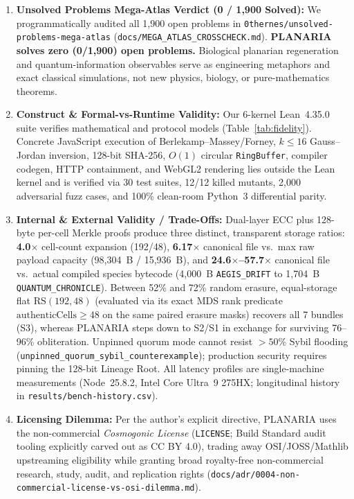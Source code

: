 \documentclass[11pt,letterpaper]{article}
\theoremstyle{remark}
\begin{document}
\begin{enumerate}[leftmargin=1.6em, itemsep=1.5pt]
  \item \textbf{Unsolved Problems Mega-Atlas Verdict (0 / 1,900 Solved):} We programmatically audited all 1,900 open problems in \texttt{0thernes/\allowbreak unsolved-\allowbreak problems-\allowbreak mega-\allowbreak atlas} (\texttt{docs/\allowbreak MEGA\_\allowbreak ATLAS\_\allowbreak CROSSCHECK.md}). \textbf{PLANARIA solves zero (0/1,900) open problems.} Biological planarian regeneration and quantum-information observables serve as engineering metaphors and exact classical simulations, not new physics, biology, or pure-mathematics theorems.
  \item \textbf{Construct \& Formal-vs-Runtime Validity:} Our 6-kernel Lean~4.35.0 suite verifies mathematical and protocol models (Table~\ref{tab:fidelity}). Concrete JavaScript execution of Berlekamp--Massey/Forney, $k\le 16$ Gauss--Jordan inversion, 128-bit SHA-256, $O(1)$ circular \texttt{RingBuffer}, compiler codegen, HTTP containment, and WebGL2 rendering lies outside the Lean kernel and is verified via 30 test suites, 12/12 killed mutants, 2,000 adversarial fuzz cases, and 100\% clean-room Python~3 differential parity.
  \item \textbf{Internal \& External Validity / Trade-Offs:} Dual-layer ECC plus 128-byte per-cell Merkle proofs produce three distinct, transparent storage ratios: \textbf{4.0$\times$} cell-count expansion (192/48), \textbf{6.17$\times$} canonical file vs.\ max raw payload capacity (98,304~B / 15,936~B), and \textbf{24.6$\times$--57.7$\times$} canonical file vs.\ actual compiled species bytecode (4,000~B \texttt{AEGIS\_\allowbreak DRIFT} to 1,704~B \texttt{QUANTUM\_\allowbreak CHRONICLE}). Between 52\% and 72\% random erasure, equal-storage flat $\mathrm{RS}(192,48)$ (evaluated via its exact MDS rank predicate $\text{authenticCells}\ge 48$ on the same paired erasure masks) recovers all 7 bundles (S3), whereas PLANARIA steps down to S2/S1 in exchange for surviving 76--96\% obliteration. Unpinned quorum mode cannot resist $>50\%$ Sybil flooding (\texttt{unpinned\_\allowbreak quorum\_\allowbreak sybil\_\allowbreak counterexample}); production security requires pinning the 128-bit Lineage Root. All latency profiles are single-machine measurements (Node~25.8.2, Intel Core Ultra~9 275HX; longitudinal history in \texttt{results/\allowbreak bench-history.csv}).
  \item \textbf{Licensing Dilemma:} Per the author's explicit directive, PLANARIA uses the non-commercial \emph{Cosmogonic License} (\texttt{LICENSE}; Build Standard audit tooling explicitly carved out as CC BY 4.0), trading away OSI/JOSS/Mathlib upstreaming eligibility while granting broad royalty-free non-commercial research, study, audit, and replication rights (\nolinkurl{docs/adr/0004-non-commercial-license-vs-osi-dilemma.md}).
\end{enumerate}
\end{document}

